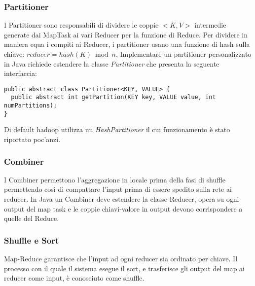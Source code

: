 \subsubsection{Partitioner}
I Partitioner sono responsabili di dividere le coppie $<K,V>$ intermedie generate dai MapTask ai vari Reducer per la funzione di Reduce. Per dividere in maniera equa i compiti ai Reducer, i partitioner usano una funzione di hash sulla chiave: $reducer = hash(K) \bmod n$. Implementare un partitioner personalizzato in Java richiede estendere la classe \textit{Partitioner} che presenta la seguente interfaccia:
\begin{lstlisting}
public abstract class Partitioner<KEY, VALUE> {
  public abstract int getPartition(KEY key, VALUE value, int numPartitions);
}
\end{lstlisting}
Di default hadoop utilizza un \textit{HashPartitioner} il cui funzionamento è stato riportato poc'anzi.
\subsubsection{Combiner}
I Combiner permettono l'aggregazione in locale prima della fasi di shuffle permettendo così di compattare l'input prima di essere spedito sulla rete ai reducer. In Java un Combiner deve estendere la classe Reducer, opera su ogni output del map task e le coppie chiavi-valore in output devono corrispondere a quelle del Reduce.
\subsubsection{Shuffle e Sort}
Map-Reduce garantisce che l'input ad ogni reducer sia ordinato per chiave. Il processo con il quale il sistema esegue il sort, e trasferisce gli output del map ai reducer come input, è conosciuto come shuffle.
